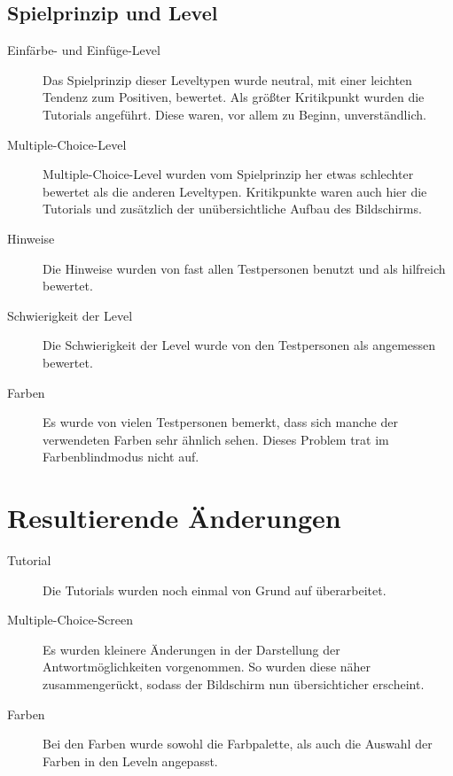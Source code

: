 \subsection{Spielprinzip und Level}
\begin{description}
\item[Einfärbe- und Einfüge-Level] Das Spielprinzip dieser Leveltypen wurde neutral, mit einer leichten Tendenz zum Positiven, bewertet.
Als größter Kritikpunkt wurden die Tutorials angeführt. Diese waren, vor allem zu Beginn, unverständlich.

\item[Multiple-Choice-Level] Multiple-Choice-Level wurden vom Spielprinzip her etwas schlechter bewertet als die anderen Leveltypen.
Kritikpunkte waren auch hier die Tutorials und zusätzlich der unübersichtliche Aufbau des Bildschirms.

\item[Hinweise] Die Hinweise wurden von fast allen Testpersonen benutzt und als hilfreich bewertet.

\item[Schwierigkeit der Level] Die Schwierigkeit der Level wurde von den Testpersonen als angemessen bewertet.
\item[Farben]Es wurde von vielen Testpersonen bemerkt, dass sich manche der verwendeten Farben sehr ähnlich sehen.
Dieses Problem trat im Farbenblindmodus nicht auf.
\end{description}


\section{Resultierende Änderungen}
\begin{description}
\item[Tutorial] Die Tutorials wurden noch einmal von Grund auf überarbeitet.
\item[Multiple-Choice-Screen] Es wurden kleinere Änderungen in der Darstellung der Antwortmöglichkeiten vorgenommen.
So wurden diese näher zusammengerückt, sodass der Bildschirm nun übersichticher erscheint.
\item[Farben] Bei den Farben wurde sowohl die Farbpalette, als auch die Auswahl der Farben in den Leveln angepasst.
\end{description}
